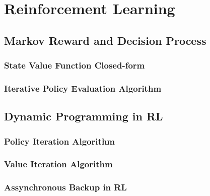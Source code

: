 
\chapter{Reinforcement Learning} %
	\label{cha:reinforcement_learning}


\section{Markov Reward and Decision Process} %
	\label{sec:markov_reward_and_decision_process}

	\subsection{State Value Function Closed-form} %
		\label{sub:state_value_function}
		

	\subsection{Iterative Policy Evaluation Algorithm} %
		\label{sub:iterative_policy_evaluation_algorithm}


\section{Dynamic Programming in RL} %
	\label{sec:dynamic_programming_in_rl}

	\subsection{Policy Iteration Algorithm} %
		\label{sub:policy_iteration_algorithm}
		

	\subsection{Value Iteration Algorithm} %
		\label{sub:value_iteration_algorithm}
	

	\subsection{Assynchronous Backup in RL} %
		\label{sub:assynchronous_backup_in_rl}
		
